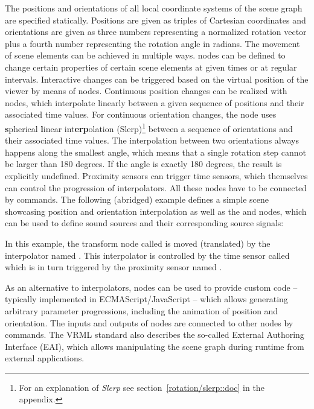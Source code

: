 The positions and orientations of all local coordinate systems of the scene
graph are specified statically.
Positions are given as triples of Cartesian coordinates
and orientations are given as
three numbers representing a normalized rotation vector
plus a fourth number representing the rotation angle in radians.
The movement of scene elements can be achieved in multiple ways.
 nodes can be defined
to change certain properties of certain scene elements at given times
or at regular intervals.
Interactive changes can be triggered based on
the virtual position of the viewer
by means of  nodes.
Continuous position changes can be realized with
 nodes, which interpolate linearly
between a given sequence of positions and their associated time values.
For continuous orientation changes, the
 node uses
\textbf{s}pherical \textbf{l}inear int\textbf{erp}olation (Slerp)\footnote{%
For an explanation of \emph{Slerp}
see section~\ref{rotation/slerp::doc} in the appendix.}
between a sequence of orientations and their associated time values.
The interpolation between two orientations always happens along the smallest
angle, which means that a single rotation step cannot be larger than 180
degrees.
If the angle is exactly 180 degrees, the result is explicitly undefined.
Proximity sensors can trigger time sensors,
which themselves can control the progression of interpolators.
All these nodes have to be connected by  commands.
The following (abridged) example
defines a simple scene showcasing position and orientation interpolation
as well as the  and  nodes,
which can be used to define sound sources
and their corresponding source signals:


\noindent
In this example, the transform node called 
is moved (\ie translated) by the interpolator named .
This interpolator is controlled
by the time sensor called 
which is in turn triggered by the proximity sensor named .

As an alternative to interpolators,
 nodes can be used to provide custom code
-- typically implemented in ECMAScript/JavaScript --
which allows generating arbitrary parameter progressions,
including the animation of position and orientation.
The inputs and outputs of  nodes
are connected to other nodes by  commands.
The VRML standard also describes the so-called
External Authoring Interface (EAI),
which allows manipulating the scene graph during runtime
from external applications.


